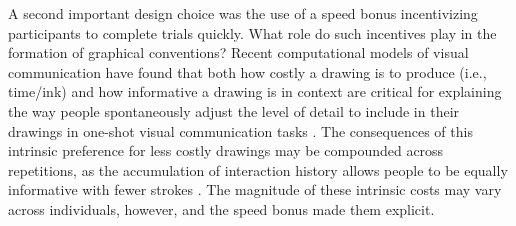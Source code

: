 \documentclass[10pt,letterpaper]{article}
\begin{document}
A second important design choice was the use of a speed bonus incentivizing participants to complete trials quickly.
What role do such incentives play in the formation of graphical conventions?
Recent computational models of visual communication have found that both how costly a drawing is to produce (i.e., time/ink) and how informative a drawing is in context are critical for explaining the way people spontaneously adjust the level of detail to include in their drawings in one-shot visual communication tasks \cite{fan2019pragmatic}.
The consequences of this intrinsic preference for less costly drawings may be compounded across repetitions, as the accumulation of interaction history allows people to be equally informative with fewer strokes \cite{HawkinsFrankGoodman17_ConventionFormation}.
The magnitude of these intrinsic costs may vary across individuals, however, and the speed bonus made them explicit.


\end{document}
